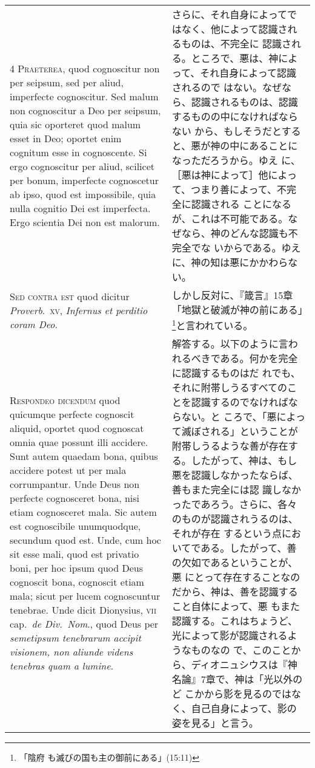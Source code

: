 \documentclass[10pt]{jsarticle} %
\begin{document}
\begin{longtable}{p{21em}p{21em}}
\\


{\scshape 4 Praeterea}, quod cognoscitur non per
seipsum, sed per aliud, imperfecte cognoscitur. Sed malum non
cognoscitur a Deo per seipsum, quia sic oporteret quod malum esset in
Deo; oportet enim cognitum esse in cognoscente. Si ergo cognoscitur per
aliud, scilicet per bonum, imperfecte cognoscetur ab ipso, quod est
impossibile, quia nulla cognitio Dei est imperfecta. Ergo scientia Dei
non est malorum.

&

さらに、それ自身によってではなく、他によって認識されるものは、不完全に
認識される。ところで、悪は、神によって、それ自身によって認識されるので
はない。なぜなら、認識されるものは、認識するものの中になければならない
から、もしそうだとすると、悪が神の中にあることになっただろうから。ゆえ
に、［悪は神によって］他によって、つまり善によって、不完全に認識される
ことになるが、これは不可能である。なぜなら、神のどんな認識も不完全でな
いからである。ゆえに、神の知は悪にかかわらない。


\\


{\scshape Sed contra est} quod dicitur {\itshape Proverb}.~{\scshape xv},
{\itshape Infernus et perditio coram Deo}.

&

しかし反対に、『箴言』15章「地獄と破滅が神の前にある」\footnote{「陰府
も滅びの国も主の御前にある」(15:11)}と言われている。


\\


{\scshape Respondeo dicendum} quod quicumque perfecte cognoscit aliquid,
oportet quod cognoscat omnia quae possunt illi accidere. Sunt autem
quaedam bona, quibus accidere potest ut per mala corrumpantur. Unde Deus
non perfecte cognosceret bona, nisi etiam cognosceret mala. Sic autem
est cognoscibile unumquodque, secundum quod est. Unde, cum hoc sit esse
mali, quod est privatio boni, per hoc ipsum quod Deus cognoscit bona,
cognoscit etiam mala; sicut per lucem cognoscuntur tenebrae. Unde dicit
Dionysius, {\scshape vii} cap.~{\itshape de Div.~Nom}., quod Deus per
{\itshape semetipsum tenebrarum accipit visionem, non aliunde videns
tenebras quam a lumine}.

&

解答する。以下のように言われるべきである。何かを完全に認識するものはだ
れでも、それに附帯しうるすべてのことを認識するのでなければならない。と
ころで、「悪によって滅ぼされる」ということが附帯しうるような善が存在す
る。したがって、神は、もし悪を認識しなかったならば、善もまた完全には認
識しなかったであろう。さらに、各々のものが認識されうるのは、それが存在
するという点においてである。したがって、善の欠如であるということが、悪
にとって存在することなのだから、神は、善を認識すること自体によって、悪
もまた認識する。これはちょうど、光によって影が認識されるようなものなの
で、このことから、ディオニュシウスは『神名論』7章で、神は「光以外のど
こかから影を見るのではなく、自己自身によって、影の姿を見る」と言う。


\end{longtable}
\end{document}
